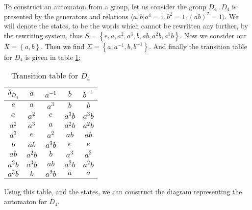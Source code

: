 \documentclass[10pt]{amsart}
\theoremstyle{definition}
\theoremstyle{remark}
\begin{document}
To construct an automaton from a group, let us consider the group $D_4$. $D_4$
is presented by the generators and relations $\langle a,b | a^4=1, b^2=1,
(ab)^2=1\rangle$. We will denote the states, to be the words which cannot be
rewritten any further, by the rewriting system, thus $S=\left\{e,a,a^2,a^3,b,ab,a^2b,a^3b\right\}$. Now we consider
our $X=\left\{a,b\right\}$. Then we find
$\Sigma=\left\{a,a^{-1},b,b^{-1}\right\}$. And finally the transition table for
$D_4$ is given in table \ref{tab:d4};

\begin{table}[htpb]
  \centering
  \caption{Transition table for $D_4$}
  \label{tab:d4}
  \begin{tabular}{c||c|c|c|c}
    $\delta_{D_4}$ & $a$ & $a^{-1}$ & $b$ & $b^{-1}$\\
    \hline\hline
    $e$ & $a$ & $a^3$ & $b$ & $b$\\
    $a$ & $a^2$ & $e$ & $a^3b$ & $a^3b$\\
    $a^2$ & $a^3$ & $a$ & $a^2b$ & $a^2b$\\
    $a^3$ & $e$ & $a^2$ & $ab$ & $ab$\\
    $b$ & $ab$ & $a^3b$ & $e$ & $e$\\
    $ab$ & $a^2b$ & $b$ & $a^3$ & $a^3$\\
    $a^2b$ & $a^3b$ & $ab$ & $a^2b$ & $a^2b$\\
    $a^3b$ & $b$ & $a^2b$ & $a$ & $a$\\
  \end{tabular}
\end{table}

Using this table, and the states, we can construct the diagram representing the
automaton for $D_4$.
\end{document}
